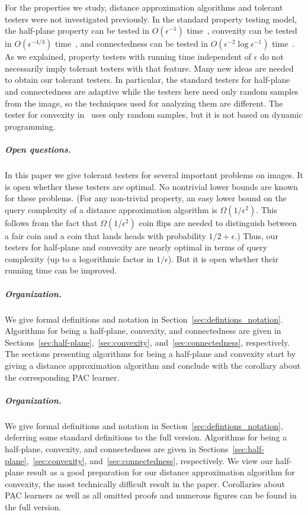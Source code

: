 \documentclass[11pt,english]{article}
\numberwithin{figure}{section}
\newcommand{\eps}{{\epsilon}}
\begin{document}
For the properties we study, distance approximation algorithms and tolerant testers were not investigated previously. In the standard property testing model, the half-plane property can be tested in $O(\eps^{-1})$ time~\cite{Ras03}, convexity can be tested in $O(\eps^{-4/3})$ time~\cite{BMR16socg}, and connectedness can be tested in $O(\eps^{-2}\log \eps^{-1})$ time~\cite{Ras03,BermanRY14}. As we explained, property testers with running time independent of $\eps$ do not necessarily imply tolerant testers with that feature.
Many new ideas are needed to obtain our tolerant testers. In particular, the standard testers for half-plane and connectedness are adaptive while the testers here need only random samples from the image, so the techniques used for analyzing them are different. The tester for convexity in~\cite{BMR16socg} uses only random samples, but it is not based on dynamic programming.




\subparagraph{Open questions.}
In this paper we give tolerant testers for several important problems on images.
It is open whether these testers are optimal. No nontrivial lower bounds are known for these problems. (For any non-trivial property, an easy lower bound on the query complexity of a distance approximation algorithm is $\Omega(1/\eps^2)$. This follows from the fact that $\Omega(1/\eps^2)$ coin flips are needed to distinguish between a fair coin and a coin that lands heads with probability $1/2+\eps$.) Thus, our testers for half-plane and convexity are nearly optimal in terms of query complexity (up to a logorithmic factor in $1/\eps$). But it is open whether their running time can be improved.


\ifnum{}
\subparagraph{Organization.} We give formal definitions and notation in Section~\ref{sec:defintions_notation}. Algorithms for being a half-plane, convexity, and connectedness are given in Sections~\ref{sec:half-plane},~\ref{sec:convexity}, and~\ref{sec:connectedness}, respectively. The sections presenting algorithms for being a half-plane and convexity start by giving a distance approximation algorithm and conclude with the corollary about the corresponding PAC learner.
\else
\subparagraph{Organization.} We give formal definitions and notation in Section~\ref{sec:defintions_notation}, deferring some standard definitions to the {\color{black} full version}. Algorithms for being a half-plane, convexity, and connectedness are given in Sections~\ref{sec:half-plane},~\ref{sec:convexity}, and~\ref{sec:connectedness}, respectively.  We view our half-plane result as a good preparation for our distance approximation algorithm for convexity, the most technically difficult result in the paper. Corollaries about PAC learners as well as all omitted proofs and numerous figures can be found in the {\color{black} full version}.
\fi
\end{document}
